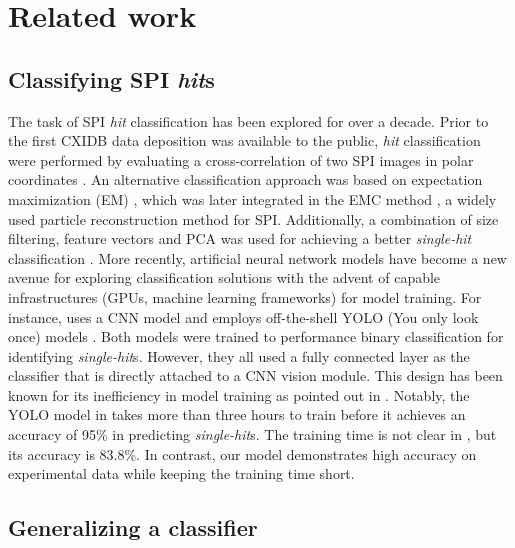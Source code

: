 \section{Related work}

\subsection{Classifying SPI \textit{hit}s}

The task of SPI \textit{hit} classification has been explored for over a decade.
Prior to the first CXIDB data deposition
\cite{seibertSingleMimivirusParticles2011} was available to the public,
\textit{hit} classification were performed by evaluating a cross-correlation of
two SPI images in polar coordinates
\cite{bortelClassificationAveragingRandom2009}.  An alternative classification
approach was based on expectation maximization (EM)
\cite{dempsterMaximumLikelihoodIncomplete1977}, which was later integrated in
the EMC method \cite{lohReconstructionAlgorithmSingleparticle2009}, a widely
used particle reconstruction method for SPI.  Additionally, a combination of
size filtering, feature vectors and PCA was used for achieving a better
\textit{single-hit} classification
\cite{bobkovSortingAlgorithmsSingleparticle2015}.  More recently, artificial
neural network models have become a new avenue for exploring classification
solutions with the advent of capable infrastructures (GPUs, machine learning
frameworks) for model training.  For instance,
\cite{shiEvaluationPerformanceClassification2019} uses a CNN model  and
\cite{ignatenkoClassificationDiffractionPatterns2021} employs off-the-shell YOLO
(You only look once) models \cite{redmonYOLO9000BetterFaster2016,
redmonYOLOv3IncrementalImprovement2018}.  Both models were trained to
performance binary classification for identifying \textit{single-hit}s.  However,
they all used a fully connected layer as the classifier that is directly
attached to a CNN vision module.  This design has been known for its
inefficiency in model training as pointed out in
\cite{schroffFaceNetUnifiedEmbedding2015}.  Notably, the YOLO model in
\cite{ignatenkoClassificationDiffractionPatterns2021} takes more than three
hours to train before it achieves an accuracy of 95\% in predicting
\textit{single-hit}s.  The training time is not clear in
\cite{shiEvaluationPerformanceClassification2019}, but its accuracy is 83.8\%.
In contrast, our model demonstrates high accuracy on experimental data while
keeping the training time short.  


\subsection{Generalizing a classifier}


